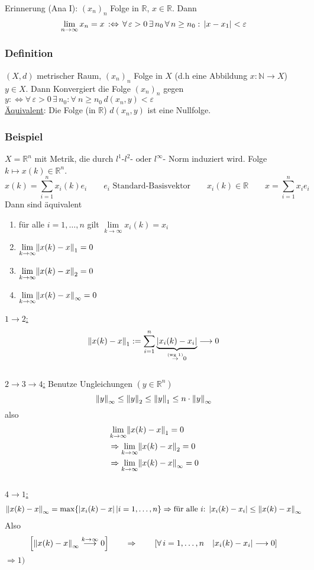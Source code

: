 Erinnerung (Ana I): $(x_n)_n$ Folge in $\mathbb{R}$, $x \in  \mathbb{R}$. Dann 
\[
\lim_{n \to \infty}x_n=x \, :\Leftrightarrow \, \forall\, \varepsilon > 0 \,\exists \,n_0 \, \forall\, n \geq n_0: \, \lvert x-x_1\rvert< \varepsilon
 \] 
\subsubsection[Konvergenz im metrischen Raum]{Definition} %
\label{ssub:definition}
$(X,d)$ metrischer Raum, $(x_n)_n$ Folge in $X$ (d.h eine Abbildung $x: \mathbb{N} \to X$) $y \in X$. Dann Konvergiert die Folge $(x_n)_n$ gegen $y :\Leftrightarrow 
 \forall\, \varepsilon >0 \, \exists \, n_0: \forall \ n \geq n_0 \, d(x_n,y)< \varepsilon $ \\
\underline{Äquivalent}: Die Folge (in $\mathbb{R}$) $d(x_n,y)$ ist eine Nullfolge.

\subsubsection[Beispiel Metrik]{Beispiel} %
\label{ssub:3.4}
$X=\mathbb{R}^n$ mit Metrik, die durch $l^1$-$ l^2$-$ \text{ oder } l^{\infty}$- Norm induziert wird. Folge $k \mapsto x(k) \in \mathbb{R}^n$.
\[
	x(k)= \sum_{i=1}^{n}x_i(k)e_i \qquad e_i \text{ Standard-Basisvektor} \qquad x_i(k) \in  \mathbb{R} \qquad x=\sum^{n}_{i=1}x_ie_i
\]
Dann sind äquivalent
\begin{enumerate}
	\item für alle $i=1,\dots,n$ gilt $\lim\limits_{k \to \infty}x_i(k)=x_i$
	\item $\lim\limits_{k \to \infty}\norm{x(k)-x}_1=0$
	\item $\lim\limits_{k \to \infty}\norm{x(k)-x}_2=0$
	\item $\lim\limits_{k \to \infty}\norm{x(k)-x}_{\infty}=0$ 
\end{enumerate}
\underline{$1 \to 2$:} 
\[
	\norm{x(k)-x}_1:=\sum^{n}_{i=1}\underset{\stackrel{\text{(wg 1)}}{\to}0}{\underbrace{\abs{x_i(k)-x_i}}} \longrightarrow 0
\]
\\
\underline{$2 \to 3 \to 4$:} Benutze Ungleichungen $(y \in \mathbb{R}^n)$
\[
	\norm{y}_{\infty} \leq \norm{y}_2 \leq \norm{y}_1 \leq n \cdot \norm{y}_{\infty}
\]
also 
\begin{align*}
	&\lim_{k \to \infty}\norm{x(k)-x}_1=0 \\
	&\Rightarrow \lim_{k \to \infty}\norm{x(k)-x}_2=0 \\
	&\Rightarrow \lim_{k \to \infty}\norm{x(k)-x}_{\infty}=0
\end{align*}
\\
\underline{$4 \to 1$:} \begin{gather*}
	\norm{x(k)-x}_{\infty} = \max\{ \abs{x_i(k)-x} \,| i=1,\dots,n \}
	\Rightarrow \text{für alle $i$: } \abs{x_i(k)-x_i} \leq \norm{x(k)-x}_{\infty}
\end{gather*}
Also
\[
	\left[ \norm{x(k)-x}_{\infty} \stackrel{k \to \infty}{\longrightarrow}0 \right] \qquad \Rightarrow \qquad \left[ \forall\, i=1,\dots,n \quad \abs{x_i(k)-x_i} \longrightarrow 0 \right]
\]
$\Rightarrow 1)$ \bewende

